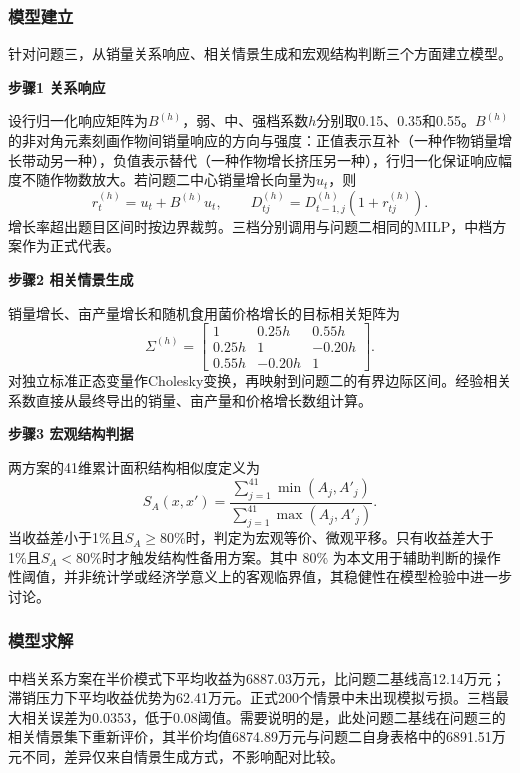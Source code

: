 \subsubsection{模型建立}

针对问题三，从销量关系响应、相关情景生成和宏观结构判断三个方面建立模型。

\textbf{步骤1 关系响应}

设行归一化响应矩阵为$B^{(h)}$，弱、中、强档系数$h$分别取0.15、0.35和0.55。$B^{(h)}$ 的非对角元素刻画作物间销量响应的方向与强度：正值表示互补（一种作物销量增长带动另一种），负值表示替代（一种作物增长挤压另一种），行归一化保证响应幅度不随作物数放大。若问题二中心销量增长向量为$u_t$，则
\begin{equation}
r_t^{(h)}=u_t+B^{(h)}u_t,\qquad D_{tj}^{(h)}=D_{t-1,j}^{(h)}\left(1+r_{tj}^{(h)}\right).
\end{equation}
增长率超出题目区间时按边界裁剪。三档分别调用与问题二相同的MILP，中档方案作为正式代表。

\textbf{步骤2 相关情景生成}

销量增长、亩产量增长和随机食用菌价格增长的目标相关矩阵为
\begin{equation}
\Sigma^{(h)}=\begin{bmatrix}1&0.25h&0.55h\\0.25h&1&-0.20h\\0.55h&-0.20h&1\end{bmatrix}.
\end{equation}
对独立标准正态变量作Cholesky变换，再映射到问题二的有界边际区间。经验相关系数直接从最终导出的销量、亩产量和价格增长数组计算。

\textbf{步骤3 宏观结构判据}

两方案的41维累计面积结构相似度定义为
\begin{equation}
S_A(x,x')=\frac{\sum_{j=1}^{41}\min(A_j,A'_j)}{\sum_{j=1}^{41}\max(A_j,A'_j)}.
\end{equation}
当收益差小于1\%且$S_A\ge80\%$时，判定为宏观等价、微观平移。只有收益差大于1\%且$S_A<80\%$时才触发结构性备用方案。其中 $80\%$ 为本文用于辅助判断的操作性阈值，并非统计学或经济学意义上的客观临界值，其稳健性在模型检验中进一步讨论。

\subsubsection{模型求解}

中档关系方案在半价模式下平均收益为6887.03万元，比问题二基线高12.14万元；滞销压力下平均收益优势为62.41万元。正式200个情景中未出现模拟亏损。三档最大相关误差为0.0353，低于0.08阈值。需要说明的是，此处问题二基线在问题三的相关情景集下重新评价，其半价均值6874.89万元与问题二自身表格中的6891.51万元不同，差异仅来自情景生成方式，不影响配对比较。

